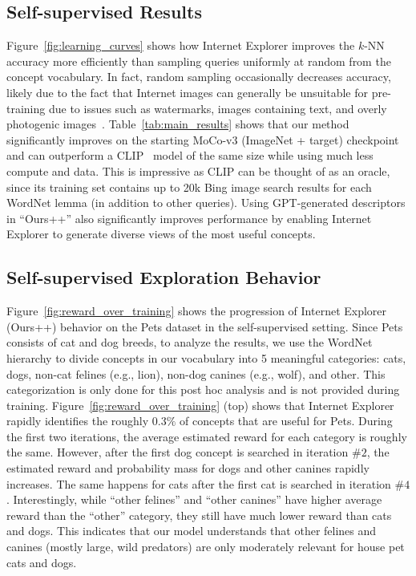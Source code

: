 \subsection{Self-supervised Results}
Figure~\ref{fig:learning_curves} shows how Internet Explorer improves the $k$-NN accuracy more efficiently than sampling queries uniformly at random from the concept vocabulary. In fact, random sampling occasionally decreases accuracy, likely due to the fact that Internet images can generally be unsuitable for pre-training due to issues such as watermarks, images containing text, and overly photogenic images~\cite{mezuman2012learning,chen2015webly}. Table~\ref{tab:main_results} shows that our method significantly improves on the starting MoCo-v3 (ImageNet + target) checkpoint and can outperform a CLIP~\cite{radford2021learning} model of the same size while using much less compute and data. This is impressive as CLIP can be thought of as an oracle, since its training set contains up to 20k Bing image search results for each WordNet lemma (in addition to other queries).
Using GPT-generated descriptors in ``Ours++'' also significantly improves performance by enabling Internet Explorer to generate diverse views of the most useful concepts. 

\subsection{Self-supervised Exploration Behavior}
Figure~\ref{fig:reward_over_training} shows the progression of Internet Explorer (Ours++) behavior on the Pets dataset in the self-supervised setting. Since Pets consists of cat and dog breeds, to analyze the results, we use the WordNet hierarchy to divide concepts in our vocabulary into 5 meaningful categories: cats, dogs, non-cat felines (e.g., lion), non-dog canines (e.g., wolf), and other. This categorization is only done for this post hoc analysis and is not provided during training. Figure~\ref{fig:reward_over_training} (top) shows that
Internet Explorer rapidly identifies the roughly $0.3\%$ of concepts that are useful for Pets. During the first two iterations, the average estimated reward for each category is roughly the same. However, after the first dog concept is searched in iteration $\#2$, the estimated reward and probability mass for dogs and other canines rapidly increases. The same happens for cats after the first cat is searched in iteration $\#4$. Interestingly, while ``other felines'' and ``other canines''  have higher average reward than the ``other'' category, they still have much lower reward than cats and dogs. This indicates that our model understands that other felines and canines (mostly large, wild predators) are only moderately relevant for house pet cats and dogs. 

